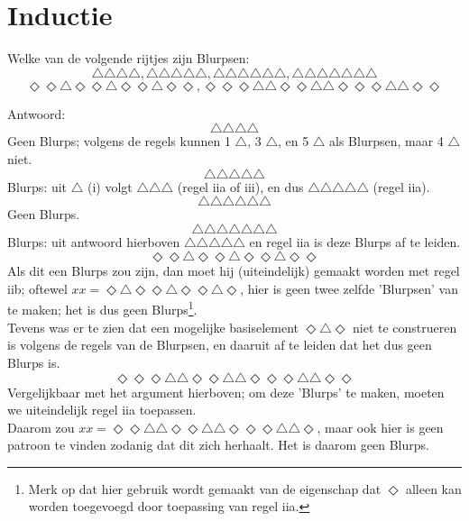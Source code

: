 \section{Inductie}

\begin{answer} %
Welke van de volgende rijtjes zijn Blurpsen:
$$\triangle\triangle\triangle\triangle, \triangle\triangle\triangle\triangle\triangle, \triangle\triangle\triangle\triangle\triangle\triangle, \triangle\triangle\triangle\triangle\triangle\triangle\triangle$$
$$\Diamond\Diamond\triangle\Diamond\Diamond\triangle\Diamond\Diamond\triangle\Diamond\Diamond, \Diamond\Diamond\Diamond\triangle\triangle\Diamond\Diamond\triangle\triangle\Diamond\Diamond\Diamond\triangle\triangle\Diamond\Diamond$$

\noindent Antwoord:
$$\triangle\triangle\triangle\triangle$$
Geen Blurps; volgens de regels kunnen 1 $\triangle$, 3 $\triangle$, en 5 $\triangle$ als Blurpsen, maar 4 $\triangle$ niet.
$$\triangle\triangle\triangle\triangle\triangle$$ 
Blurps: uit $\triangle$ (i) volgt $\triangle\triangle\triangle$ (regel iia of iii), en dus $\triangle\triangle\triangle\triangle\triangle$ (regel iia).
$$\triangle\triangle\triangle\triangle\triangle\triangle$$ 
Geen Blurps.
$$\triangle\triangle\triangle\triangle\triangle\triangle\triangle$$
Blurps: uit antwoord hierboven $\triangle\triangle\triangle\triangle\triangle$ en regel iia is deze Blurps af te leiden.
$$\Diamond\Diamond\triangle\Diamond\Diamond\triangle\Diamond\Diamond\triangle\Diamond\Diamond$$ 
Als dit een Blurps zou zijn, dan moet hij (uiteindelijk) gemaakt worden met regel iib; oftewel $xx=\Diamond\triangle\Diamond\Diamond\triangle\Diamond\Diamond\triangle\Diamond$, hier is geen twee zelfde 'Blurpsen' van te maken; het is dus geen Blurps\footnote{Merk op dat hier gebruik wordt gemaakt van de eigenschap dat $\Diamond$ alleen kan worden toegevoegd door toepassing van regel iia.}.\\
Tevens was er te zien dat een mogelijke basiselement $\Diamond\triangle\Diamond$ niet te construeren is volgens de regels van de Blurpsen, en daaruit af te leiden dat het dus geen Blurps is.
$$\Diamond\Diamond\Diamond\triangle\triangle\Diamond\Diamond\triangle\triangle\Diamond\Diamond\Diamond\triangle\triangle\Diamond\Diamond$$
Vergelijkbaar met het argument hierboven; om deze 'Blurps' te maken, moeten we uiteindelijk regel iia toepassen. \\
Daarom zou $xx= \Diamond\Diamond\triangle\triangle\Diamond\Diamond\triangle\triangle\Diamond\Diamond\Diamond\triangle\triangle\Diamond$, maar ook hier is geen patroon te vinden zodanig dat dit zich herhaalt. Het is daarom geen Blurps.
\end{answer}

